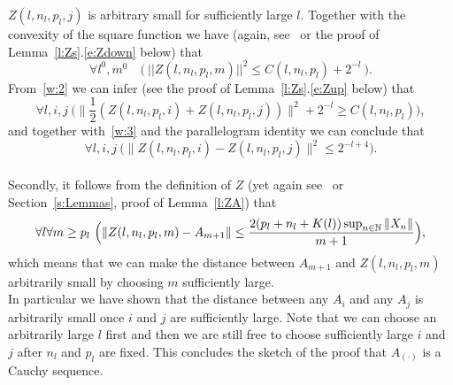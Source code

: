 $Z(l,n_l,p_l,j)$ is arbitrary small for sufficiently large $l$. Together with the convexity of the 
square function we have (again, see~\cite{Wittmann90} or the proof of Lemma~\ref{l:Zs}.\eqref{e:Zdown} below) that
\[ \forall l^0,m^0\quad 
\big(\ ||Z(l,n_l,p_l,m)||^2\leq C(l, n_l, p_l) + 2^{-l}\ \big).
\tag{W3}\label{w:3}\]
From~\eqref{w:2} we can infer (see the proof of Lemma~\ref{l:Zs}.\eqref{e:Zup} below) that
\[
\forall l,i,j\ \Big(\big\|\frac{1}{2}(Z(l,n_l,p_l,i)+Z(l,n_l,p_l,j))\big\|^2 + 2^{-l} \geq C(l, n_l, p_l)\Big),
\]
and together with~\eqref{w:3} and the parallelogram identity we can conclude that
\[
\forall l,i,j\ \Big(\big\|Z(l,n_l,p_l,i)-Z(l,n_l,p_l,j)\big\|^2 \leq  2^{-l+4}\Big).
\]\\
Secondly, it follows from the definition of $Z$ (yet again see~\cite{Wittmann90} or Section~\ref{s:Lemmas}, 
proof of Lemma~\ref{l:ZA}) that 
 \begin{align*} \forall l\forall m\geq p_l\ \Big( \|Z(l,n_l,p_l,m)-A_{m+1}\|\leq \frac{
 2(p_l+n_l+K(l))\sup_{n\in\mathbb{N}}\|X_n\|}{m+1} \Big),\end{align*}
which means that we can make the distance between $A_{m+1}$ and $Z(l,n_l,p_l,m)$ arbitrarily small by
choosing $m$ sufficiently large.\\
In particular we have shown that the distance between any $A_i$ and any $A_j$ is arbitrarily small 
once $i$ and $j$ are sufficiently large. Note that we can choose an arbitrarily large $l$ first and then we 
are still free to choose sufficiently large $i$ and $j$ after $n_l$ and $p_l$ are fixed.
This concludes the sketch of the proof that $A_{(\cdot)}$ is a Cauchy sequence.\\
